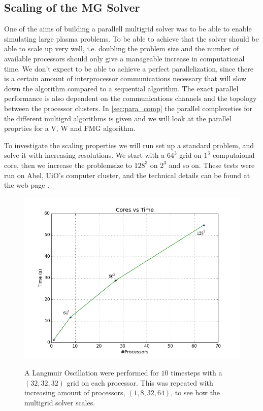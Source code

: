 \subsection{Scaling of the MG Solver}
	One of the aims of building a parallell multigrid solver was to be able
	to enable simulating large plasma problems. To be able to achieve that the solver
	should be able to scale up very well, i.e. doubling the problem size and the number
	of available processors should only give a manageable increase in computational time.
	We don't expect to be able to achieve a perfect parallelization, since there is
	a certain amount of interprocessor communications necessary that will slow down
	the algorithm compared to a sequential algorithm. The exact parallel performance
	is also dependent on the communications channels and the topology between the processor clusters.
	In \cref{sec:para_comp} the parallel
	complexeties for the different multigrd algorithms is given and we will look at
	the parallel proprties for a V, W and FMG algorithm.


	To investigate the scaling properties we will run set up a standard problem,
	and solve it with increasing resolutions. We start with a \(64^3\) grid on
 	\(1^3\) computaional core, then we increase the problemsize to \(128^3\) on \(2^3\)
	and so on. These tests were run on Abel, UiO's computer cluster, and the technical details
	can be found at the web page \citep{_more_????}.
	\begin{figure}{\textwidth}
		\label{fig:scalingMG}
		\includegraphics{figures/performance/scalingMG}
		\caption{A Langmuir Oscillation were performed for \(10\) timesteps with a \((32,32,32)\) grid on each processor.
		This was repeated with increasing amount of processors, \((1, 8, 32, 64)\), to see how the multigrid solver scales.}
	\end{figure}
